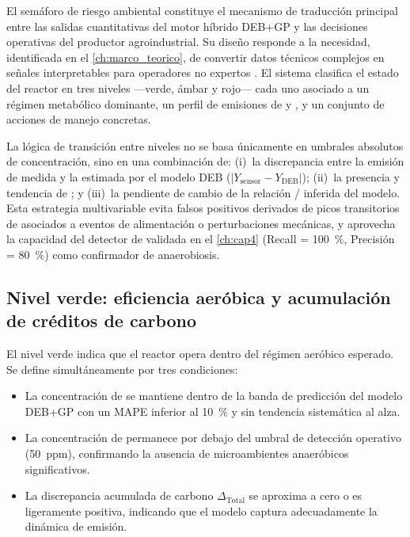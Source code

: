 
El semáforo de riesgo ambiental constituye el mecanismo de traducción principal entre las salidas cuantitativas del motor híbrido DEB+GP y las decisiones operativas del productor agroindustrial. Su diseño responde a la necesidad, identificada en el \cref{ch:marco_teorico}, de convertir datos técnicos complejos en señales interpretables para operadores no expertos \parencite{adadiPeekingBlackBoxSurvey2018}. El sistema clasifica el estado del reactor en tres niveles —verde, ámbar y rojo— cada uno asociado a un régimen metabólico dominante, un perfil de emisiones de  y , y un conjunto de acciones de manejo concretas.

La lógica de transición entre niveles no se basa únicamente en umbrales absolutos de concentración, sino en una combinación de: (i)~la discrepancia entre la emisión de  medida y la estimada por el modelo DEB ($|Y_{\text{sensor}} - Y_{\text{DEB}}|$); (ii)~la presencia y tendencia de ; y (iii)~la pendiente de cambio de la relación / inferida del modelo. Esta estrategia multivariable evita falsos positivos derivados de picos transitorios de  asociados a eventos de alimentación o perturbaciones mecánicas, y aprovecha la capacidad del detector de  validada en el \cref{ch:cap4} (Recall = \num{100}~\%, Precisión = \num{80}~\%) como confirmador de anaerobiosis.

\subsection{Nivel verde: eficiencia aeróbica y acumulación de créditos de carbono}
\label{subsec:cap5_verde}

El nivel verde indica que el reactor opera dentro del régimen aeróbico esperado. Se define simultáneamente por tres condiciones:

\begin{itemize}
    \item La concentración de  se mantiene dentro de la banda de predicción del modelo DEB+GP con un MAPE inferior al \num{10}~\% y sin tendencia sistemática al alza.
    \item La concentración de  permanece por debajo del umbral de detección operativo (\num{50}~ppm), confirmando la ausencia de microambientes anaeróbicos significativos.
    \item La discrepancia acumulada de carbono $\Delta_{\text{Total}}$ se aproxima a cero o es ligeramente positiva, indicando que el modelo captura adecuadamente la dinámica de emisión.
\end{itemize}

